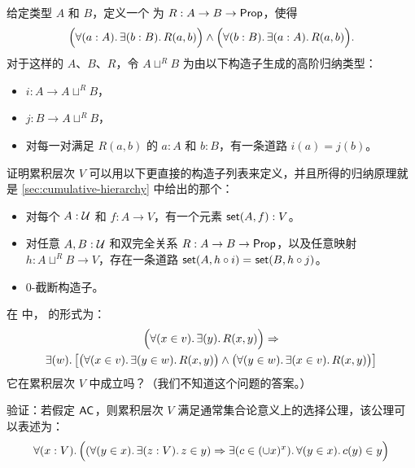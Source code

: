 \begin{ex}\label{ex:cumhierhit}
  给定类型 $A$ 和 $B$，定义一个
  为 $R:A\to B\to \mathsf{Prop}$，使得
  \[ \Big(\fall{a:A}\exis{b:B} R(a,b) \Big) \land \Big(\fall{b:B}\exis{a:A} R(a,b) \Big). \]
  对于这样的 $A$、$B$、$R$，令 $A\sqcup^R B$ 为由以下构造子生成的高阶归纳类型：
  \begin{itemize}
  \item $i:A\to A\sqcup^R B$，
  \item $j:B\to A\sqcup^R B$，
  \item 对每一对满足 $R(a,b)$ 的 $a:A$ 和 $b:B$，有一条道路 $i(a)=j(b)$。
  \end{itemize}
  证明累积层次 $V$ 可以用以下更直接的构造子列表来定义，并且所得的归纳原理就是 \cref{sec:cumulative-hierarchy} 中给出的那个：
  \begin{itemize}
  \item 对每个 $A : \mathcal{U}$ 和 $f : A \to V$，有一个元素 $\mathsf{set}(A, f) : V$。
  \item 对任意 $A,B:\mathcal{U}$ 和双完全关系
    $R:A\to B\to \mathsf{Prop}$，以及任意映射 $h:A\sqcup^R B \to V$，存在一条道路 $\mathsf{set}(A,h\circ i) =_{} \mathsf{set}(B,h\circ j)$。
  \item 0-截断构造子。
  \end{itemize}
\end{ex}

\begin{ex}\label{ex:strong-collection}
  在 \CZF 中，
  的形式为：
   \begin{multline*}
   \Parens{\fall{x\in v}\exis{y} R(x,y)} \Rightarrow \\
   \exis{w}\big[\big(\fall{x\in v}\exis{y\in w}R(x,y)\big)\land \big(\fall{y\in w}\exis{x\in v}R(x,y) \big)\big]
   \end{multline*}
   它在累积层次 $V$ 中成立吗？（我们不知道这个问题的答案。）
\end{ex}

\begin{ex}\label{ex:choice-cumulative-hierarchy-choice}
验证：若假定 $\mathsf{AC}_{}$，则累积层次 $V$ 满足通常集合论意义上的选择公理，该公理可以表述为：
  \[
   \fall{x:V} \Parens{(\fall{y\in x}\exis{z:V} z\in y) \Rightarrow  \exis{c\in(\cup x)^x}\fall{y\in x} c(y)\in y}
   \]
\end{ex}

